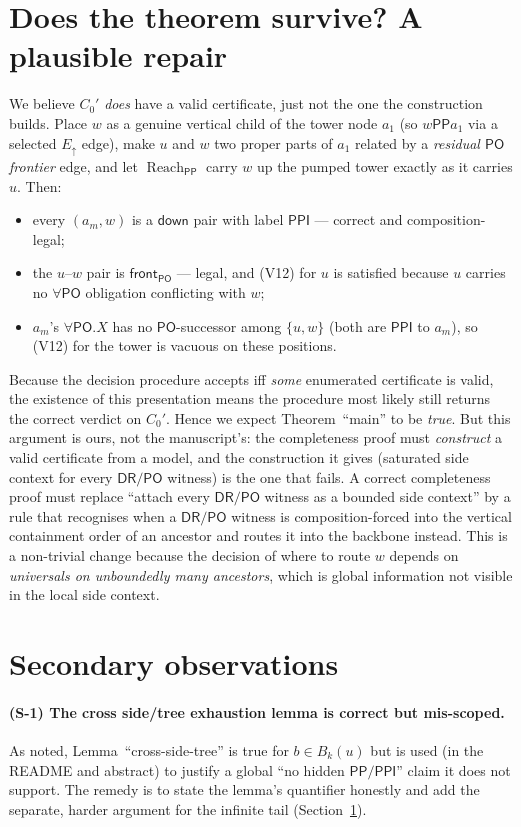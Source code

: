 \documentclass[11pt]{article}
\newcommand{\DR}{\mathsf{DR}}
\newcommand{\PO}{\mathsf{PO}}
\newcommand{\PP}{\mathsf{PP}}
\newcommand{\PPI}{\mathsf{PPI}}
\newcommand{\reach}{\operatorname{Reach}}
\newcommand{\Eup}{E_{\uparrow}}
\newcommand{\down}{\mathsf{down}}
\newcommand{\fronttag}{\mathsf{front}}
\begin{document}
\section{Does the theorem survive? A plausible repair}
\label{sec:survive}

We believe $C_0'$ \emph{does} have a valid certificate, just not the one the
construction builds.  Place $w$ as a genuine vertical child of the tower node
$a_1$ (so $w\PP a_1$ via a selected $\Eup$ edge), make $u$ and $w$ two proper
parts of $a_1$ related by a \emph{residual $\PO$ frontier} edge, and let
$\reach_{\PP}$ carry $w$ up the pumped tower exactly as it carries $u$.  Then:
\begin{itemize}
\item every $(a_m,w)$ is a $\down$ pair with label $\PPI$ --- correct and
composition-legal;
\item the $u$--$w$ pair is $\fronttag_{\PO}$ --- legal, and (V12) for $u$ is
satisfied because $u$ carries no $\forall\PO$ obligation conflicting with $w$;
\item $a_m$'s $\forall\PO.X$ has no $\PO$-successor among $\{u,w\}$ (both are
$\PPI$ to $a_m$), so (V12) for the tower is vacuous on these positions.
\end{itemize}
Because the decision procedure accepts iff \emph{some} enumerated certificate is
valid, the existence of this presentation means the procedure most likely still
returns the correct verdict on $C_0'$.  Hence we expect Theorem~``main'' to be
\emph{true}.  But this argument is ours, not the manuscript's: the completeness
proof must \emph{construct} a valid certificate from a model, and the construction
it gives (saturated side context for every $\DR/\PO$ witness) is the one that
fails.  A correct completeness proof must replace ``attach every $\DR/\PO$
witness as a bounded side context'' by a rule that recognises when a $\DR/\PO$
witness is composition-forced into the vertical containment order of an ancestor
and routes it into the backbone instead.  This is a non-trivial change because
the decision of where to route $w$ depends on \emph{universals on unboundedly
many ancestors}, which is global information not visible in the local side
context.

\section{Secondary observations}

\paragraph{(S-1) The cross side/tree exhaustion lemma is correct but mis-scoped.}
As noted, Lemma~``cross-side-tree'' is true for $b\in B_k(u)$ but is used (in the
README and abstract) to justify a global ``no hidden $\PP/\PPI$'' claim it does
not support.  The remedy is to state the lemma's quantifier honestly and add the
separate, harder argument for the infinite tail (Section~\ref{sec:survive}).
\end{document}
